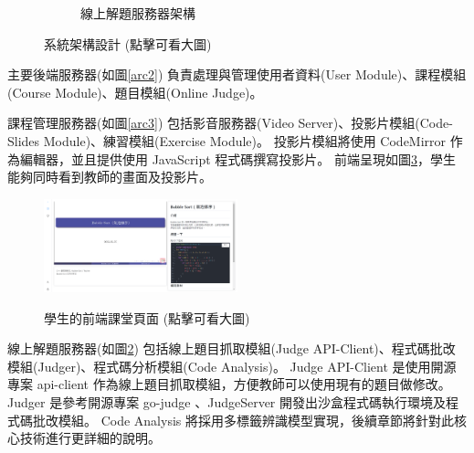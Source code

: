 \documentclass[12pt]{article}
\begin{document}
\begin{enumerate}
\begin{enumerate}
\begin{enumerate}[label=(\arabic*)]
\begin{figure}[htb]
\begin{subfigure}{0.45\linewidth}
{              }
              \caption{線上解題服務器架構}
              \label{arc4}            
            \end{subfigure}
            \caption{系統架構設計 (點擊可看大圖)}
          \end{figure}
      
          \par 主要後端服務器(如圖\ref{arc2})
            負責處理與管理使用者資料(User Module)、課程模組(Course Module)、題目模組(Online Judge)。
          
          \par 課程管理服務器(如圖\ref{arc3})
            包括影音服務器(Video Server)、投影片模組(Code-Slides Module)、練習模組(Exercise Module)。
            投影片模組將使用 CodeMirror 作為編輯器，並且提供使用 JavaScript 程式碼撰寫投影片。
            前端呈現如圖\ref{arc5}，學生能夠同時看到教師的畫面及投影片。
          \begin{figure}[H]
            \centering
            \href{https://raw.githubusercontent.com/programingtw/proglearn-plan/main/img/student.png}{ 
              \includegraphics[width=0.5\textwidth]{./img/student.png}
            }
            \caption{學生的前端課堂頁面 (點擊可看大圖)}
            \label{arc5}
          \end{figure}
          \par 線上解題服務器(如圖\ref{arc4})
            包括線上題目抓取模組(Judge API-Client)、程式碼批改模組(Judger)、程式碼分析模組(Code Analysis)。
             Judge API-Client 是使用開源專案 api-client \cite{apiclient} 作為線上題目抓取模組，方便教師可以使用現有的題目做修改。
             Judger 是參考開源專案 go-judge \cite{judger1} 、JudgeServer \cite{judger2} 開發出沙盒程式碼執行環境及程式碼批改模組。
             Code Analysis 將採用多標籤辨識模型實現，後續章節將針對此核心技術進行更詳細的說明。
        

\end{enumerate}
\end{enumerate}
\end{enumerate}
\end{document}
